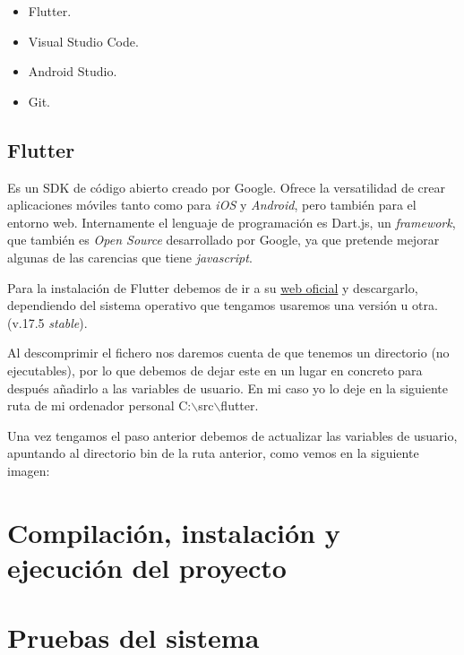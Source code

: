 \begin{itemize}
	\tightlist
	\item Flutter.
	\item Visual Studio Code.
	\item Android Studio.
	\item Git.
\end{itemize}

\subsection{Flutter}
Es un SDK de código abierto creado por Google. Ofrece la versatilidad de crear aplicaciones móviles tanto como para \emph{iOS} y \emph{Android}, pero también para el entorno web. Internamente el lenguaje de programación es Dart.js, un \emph{framework}, que también es \emph{Open Source} desarrollado por Google, ya que pretende mejorar algunas de las carencias que tiene \emph{javascript}.

Para la instalación de Flutter debemos de ir a su \href{https://flutter.dev/docs/get-started/install}{web oficial} y descargarlo, dependiendo del sistema operativo que tengamos usaremos una versión u otra. (v.17.5 \emph{stable}).

Al descomprimir el fichero nos daremos cuenta de que tenemos un directorio (no ejecutables), por lo que debemos de dejar este en un lugar en concreto para después añadirlo a las variables de usuario. En mi caso yo lo deje en la siguiente ruta de mi ordenador personal C:$\backslash$src$\backslash$flutter.

Una vez tengamos el paso anterior debemos de actualizar las variables de usuario, apuntando al directorio bin de la ruta anterior, como vemos en la siguiente imagen:

\section{Compilación, instalación y ejecución del proyecto}

\section{Pruebas del sistema}
